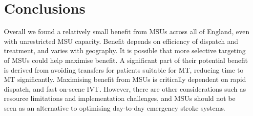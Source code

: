 \section{Conclusions}

Overall we found a relatively small benefit from MSUs across all of England, even with unrestricted MSU capacity. Benefit depends on efficiency of dispatch and treatment, and varies with geography. It is possible that more selective targeting of MSUs could help maximise benefit. A significant part of their potential benefit is derived from avoiding transfers for patients suitable for MT, reducing time to MT significantly. Maximising benefit from MSUs is critically dependent on rapid dispatch, and fast on-scene IVT. However, there are other considerations such as resource limitations and implementation challenges, and MSUs should not be seen as an alternative to optimising day-to-day emergency stroke systems.